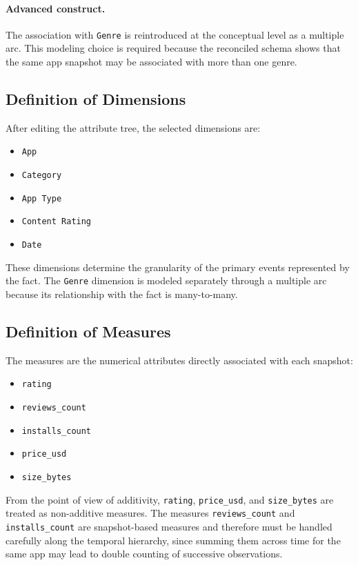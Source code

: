 \documentclass[11pt,a4paper]{article}
\begin{document}
\paragraph{Advanced construct.}
The association with \texttt{Genre} is reintroduced at the conceptual level as a multiple arc. This modeling choice is required because the reconciled schema shows that the same app snapshot may be associated with more than one genre.

\subsection{Definition of Dimensions}
After editing the attribute tree, the selected dimensions are:
\begin{itemize}[leftmargin=1.5em]
    \item \texttt{App}
    \item \texttt{Category}
    \item \texttt{App Type}
    \item \texttt{Content Rating}
    \item \texttt{Date}
\end{itemize}

These dimensions determine the granularity of the primary events represented by the fact. The \texttt{Genre} dimension is modeled separately through a multiple arc because its relationship with the fact is many-to-many.

\subsection{Definition of Measures}
The measures are the numerical attributes directly associated with each snapshot:
\begin{itemize}[leftmargin=1.5em]
    \item \texttt{rating}
    \item \texttt{reviews\_count}
    \item \texttt{installs\_count}
    \item \texttt{price\_usd}
    \item \texttt{size\_bytes}
\end{itemize}

From the point of view of additivity, \texttt{rating}, \texttt{price\_usd}, and \texttt{size\_bytes} are treated as non-additive measures. The measures \texttt{reviews\_count} and \texttt{installs\_count} are snapshot-based measures and therefore must be handled carefully along the temporal hierarchy, since summing them across time for the same app may lead to double counting of successive observations.
\end{document}

